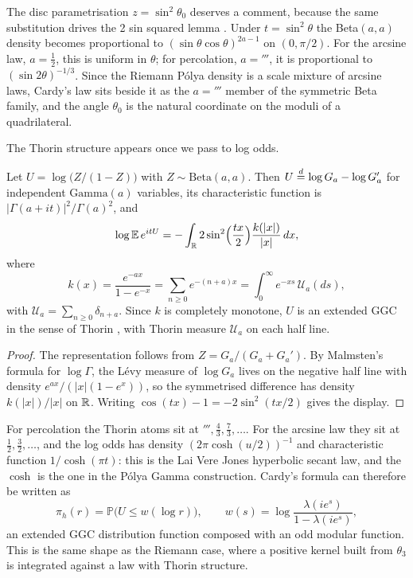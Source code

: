 The disc parametrisation $z = \sin^2\theta_0$ deserves a comment, because the same substitution drives the 2 sin squared lemma \cite{polson2017}. Under $t = \sin^2\theta$ the Beta$(a,a)$ density becomes proportional to $(\sin\theta\cos\theta)^{2a-1}$ on $(0,\pi/2)$. For the arcsine law, $a = \tfrac12$, this is uniform in $\theta$; for percolation, $a = \third$, it is proportional to $(\sin2\theta)^{-1/3}$. Since the Riemann Pólya density is a scale mixture of arcsine laws, Cardy's law sits beside it as the $a = \third$ member of the symmetric Beta family, and the angle $\theta_0$ is the natural coordinate on the moduli of a quadrilateral.

The Thorin structure appears once we pass to log odds.

\begin{proposition}\label{perc:prop:thorin}
Let $U = \log\big(Z/(1-Z)\big)$ with $Z\sim\mathrm{Beta}(a,a)$. Then $U\overset{d}{=}\log G_a-\log G_a'$ for independent $\mathrm{Gamma}(a)$ variables, its characteristic function is $|\Gamma(a+it)|^2/\Gamma(a)^2$, and
\[
\log\mathbb{E}\,e^{itU} = -\int_{\mathbb{R}}2\sin^2\!\Big(\frac{tx}{2}\Big)\frac{k(|x|)}{|x|}\,dx,
\]
where
\[
k(x) = \frac{e^{-ax}}{1-e^{-x}} = \sum_{n\ge0}e^{-(n+a)x} = \int_0^\infty e^{-xs}\,\mathcal{U}_a(ds),
\]
with $\mathcal{U}_a = \sum_{n\ge0}\delta_{n+a}$. Since $k$ is completely monotone, $U$ is an extended GGC in the sense of Thorin \cite{thorin1978}, with Thorin measure $\mathcal{U}_a$ on each half line.
\end{proposition}
\begin{proof}
The representation follows from $Z = G_a/(G_a+G_a')$. By Malmsten's formula for $\log\Gamma$, the Lévy measure of $\log G_a$ lives on the negative half line with density $e^{ax}/(|x|(1-e^x))$, so the symmetrised difference has density $k(|x|)/|x|$ on $\mathbb{R}$. Writing $\cos(tx)-1 = -2\sin^2(tx/2)$ gives the display.
\end{proof}

For percolation the Thorin atoms sit at $\third,\tfrac43,\tfrac73,\dots$. For the arcsine law they sit at $\tfrac12,\tfrac32,\dots$, and the log odds has density $(2\pi\cosh(u/2))^{-1}$ and characteristic function $1/\cosh(\pi t)$: this is the Lai Vere Jones hyperbolic secant law, and the $\cosh$ is the one in the Pólya Gamma construction. Cardy's formula can therefore be written as
\[
\pi_h(r) = \mathbb{P}\big(U\le w(\log r)\big),\qquad w(s) = \log\frac{\lambda(ie^s)}{1-\lambda(ie^s)},
\]
an extended GGC distribution function composed with an odd modular function. This is the same shape as the Riemann case, where a positive kernel built from $\theta_3$ is integrated against a law with Thorin structure.


